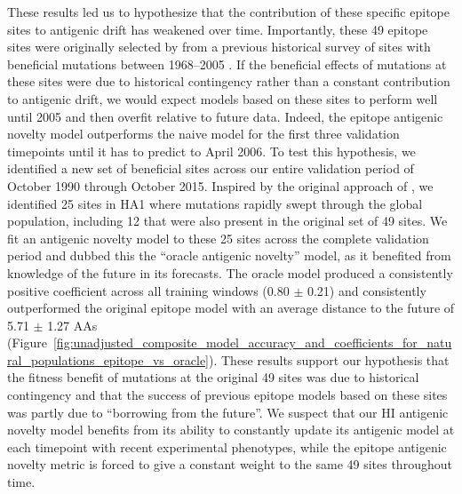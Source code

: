 These results led us to hypothesize that the contribution of these specific epitope sites to antigenic drift has weakened over time.
Importantly, these 49 epitope sites were originally selected by \cite{Luksza:2014hj} from a previous historical survey of sites with beneficial mutations between 1968--2005 \citep{Shih:2007bd}.
If the beneficial effects of mutations at these sites were due to historical contingency rather than a constant contribution to antigenic drift, we would expect models based on these sites to perform well until 2005 and then overfit relative to future data.
Indeed, the epitope antigenic novelty model outperforms the naive model for the first three validation timepoints until it has to predict to April 2006.
To test this hypothesis, we identified a new set of beneficial sites across our entire validation period of October 1990 through October 2015.
Inspired by the original approach of \cite{Shih:2007bd}, we identified 25 sites in HA1 where mutations rapidly swept through the global population, including 12 that were also present in the original set of 49 sites.
We fit an antigenic novelty model to these 25 sites across the complete validation period and dubbed this the ``oracle antigenic novelty'' model, as it benefited from knowledge of the future in its forecasts.
The oracle model produced a consistently positive coefficient across all training windows (0.80 $\pm$ 0.21) and consistently outperformed the original epitope model with an average distance to the future of 5.71 $\pm$ 1.27 AAs (Figure~\ref{fig:unadjusted_composite_model_accuracy_and_coefficients_for_natural_populations_epitope_vs_oracle}).
These results support our hypothesis that the fitness benefit of mutations at the original 49 sites was due to historical contingency and that the success of previous epitope models based on these sites was partly due to ``borrowing from the future''.
We suspect that our HI antigenic novelty model benefits from its ability to constantly update its antigenic model at each timepoint with recent experimental phenotypes, while the epitope antigenic novelty metric is forced to give a constant weight to the same 49 sites throughout time.

